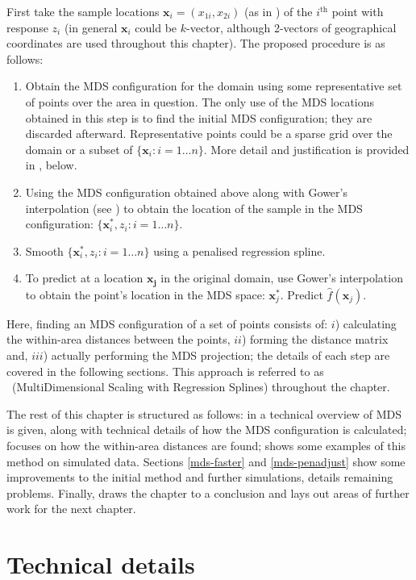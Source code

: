 First take the sample locations $\mathbf{x}_i = (x_{1i}, x_{2i})$ (as in ) of the $i^\text{th}$ point with response $z_i$ (in general $\mathbf{x}_i$ could be $k$-vector, although 2-vectors of geographical coordinates are used throughout this chapter). The proposed procedure is as follows:
\begin{enumerate}
\item Obtain the MDS configuration for the domain using some representative set of points over the area in question. The only use of the MDS locations obtained in this step is to find the initial MDS configuration; they are discarded afterward. Representative points could be a sparse grid over the domain or a subset of $\{\mathbf{x}_i : i=1\dots n\}$. More detail and justification is provided in , below.
\item Using the MDS configuration obtained above along with Gower's interpolation (see ) to obtain the location of the sample in the MDS configuration: $\{\mathbf{x}_i^*, z_i : i=1\dots n\}$.
\item Smooth $\{\mathbf{x}_i^*, z_i : i=1\dots n\}$ using a penalised regression spline.
\item To predict at a location $\mathbf{x_j}$ in the original domain, use Gower's interpolation to obtain the point's location in the MDS space: $\mathbf{x}_j^*$. Predict $\hat{f}(\mathbf{x}_j)$.
\end{enumerate}
Here, finding an MDS configuration of a set of points consists of: $i$) calculating the within-area distances between the points, $ii$) forming the distance matrix and, $iii$) actually performing the MDS projection; the details of each step are covered in the following sections. This approach is referred to as \mdsap\ (MultiDimensional Scaling with Regression Splines) throughout the chapter.

The rest of this chapter is structured as follows: in  a technical overview of MDS is given, along with technical details of how the MDS configuration is calculated;  focuses on how the within-area distances are found;  shows some examples of this method on simulated data. Sections \ref{mds-faster} and \ref{mds-penadjust} show some improvements to the initial method and further simulations,  details remaining problems. Finally,  draws the chapter to a conclusion and lays out areas of further work for the next chapter.


\section{Technical details}
\label{MDStechdet}

